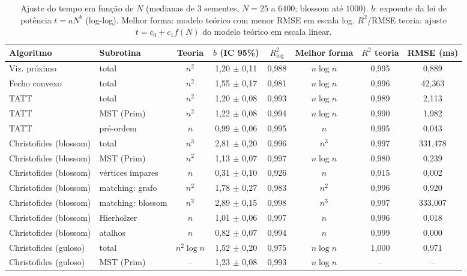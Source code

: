 \begin{table}[htb]
\centering
\caption{Ajuste do tempo em função de $N$ (medianas de 3 sementes, $N=25$ a $6400$; blossom até $1000$). $b$: expoente da lei de potência $t=aN^b$ (log-log). Melhor forma: modelo teórico com menor RMSE em escala log. $R^2$/RMSE teoria: ajuste $t=c_0+c_1f(N)$ do modelo teórico em escala linear.}
\label{tab:complexidade}
\small
\begin{adjustbox}{max width=\linewidth}
\begin{tabular}{llcccccc}
\toprule
Algoritmo & Subrotina & Teoria & $b$ (IC 95\%) & $R^2_{\log}$ & Melhor forma & $R^2$ teoria & RMSE (ms) \\
\midrule
Viz. próximo & total & $n^2$ & 1{,}20 $\pm$ 0{,}11 & 0{,}988 & $n\log n$ & 0{,}995 & 0{,}889 \\
Fecho convexo & total & $n^2$ & 1{,}55 $\pm$ 0{,}17 & 0{,}981 & $n\log n$ & 0{,}996 & 42{,}363 \\
TATT & total & $n^2$ & 1{,}20 $\pm$ 0{,}08 & 0{,}993 & $n\log n$ & 0{,}989 & 2{,}113 \\
TATT & MST (Prim) & $n^2$ & 1{,}22 $\pm$ 0{,}08 & 0{,}994 & $n\log n$ & 0{,}990 & 1{,}982 \\
TATT & pré-ordem & $n$ & 0{,}99 $\pm$ 0{,}06 & 0{,}995 & $n$ & 0{,}995 & 0{,}043 \\
Christofides (blossom) & total & $n^3$ & 2{,}81 $\pm$ 0{,}20 & 0{,}996 & $n^3$ & 0{,}997 & 331{,}478 \\
Christofides (blossom) & MST (Prim) & $n^2$ & 1{,}13 $\pm$ 0{,}07 & 0{,}997 & $n\log n$ & 0{,}980 & 0{,}239 \\
Christofides (blossom) & vértices ímpares & $n$ & 0{,}31 $\pm$ 0{,}10 & 0{,}926 & $n$ & 0{,}915 & 0{,}002 \\
Christofides (blossom) & matching: grafo & $n^2$ & 1{,}78 $\pm$ 0{,}27 & 0{,}983 & $n^2$ & 0{,}996 & 0{,}920 \\
Christofides (blossom) & matching: blossom & $n^3$ & 2{,}89 $\pm$ 0{,}15 & 0{,}998 & $n^3$ & 0{,}997 & 333{,}007 \\
Christofides (blossom) & Hierholzer & $n$ & 1{,}01 $\pm$ 0{,}06 & 0{,}997 & $n$ & 0{,}996 & 0{,}018 \\
Christofides (blossom) & atalhos & $n$ & 0{,}82 $\pm$ 0{,}07 & 0{,}994 & $n$ & 0{,}999 & 0{,}000 \\
Christofides (guloso) & total & $n^2\log n$ & 1{,}52 $\pm$ 0{,}20 & 0{,}975 & $n\log n$ & 1{,}000 & 0{,}971 \\
Christofides (guloso) & MST (Prim) & -- & 1{,}23 $\pm$ 0{,}08 & 0{,}993 & $n\log n$ & -- & -- \\

\end{tabular}
\end{adjustbox}
\end{table}
